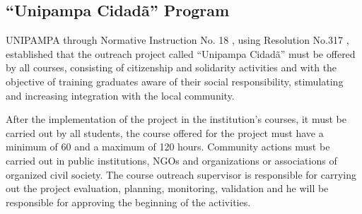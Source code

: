 \subsection{``Unipampa Cidadã'' Program}\label{sec:3.2.3}


\ac{UNIPAMPA} through Normative Instruction No. 18 \cite{unipampacidada}, using Resolution No.317 \cite{res317}, established that the outreach project called ``Unipampa Cidadã'' must be offered by all courses, consisting of citizenship and solidarity activities and with the objective of training graduates aware of their social responsibility, stimulating and increasing integration with the local community.


After the implementation of the project in the institution's courses, it must be carried out by all students, the course offered for the project must have a minimum of 60 and a maximum of 120 hours.
Community actions must be carried out in public institutions, \acp{NGO} and organizations or associations of organized civil society. 
The course outreach supervisor is responsible for carrying out the project evaluation, planning, monitoring, validation and he will be responsible for approving the beginning of the activities.


